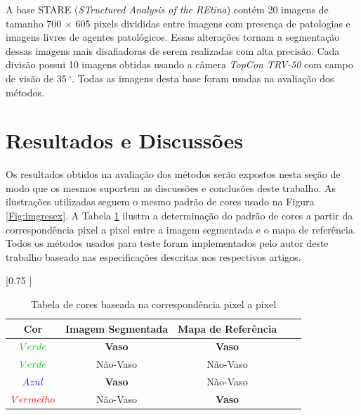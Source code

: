 A base STARE (\textit{STructured Analysis of the REtina}) cont\'{e}m 20 imagens de tamanho 700 $\times$ 605 pixels divididas entre imagens com presen\c{c}a de patologias e imagens livres de agentes patol\'{o}gicos. Essas altera\c{c}\~{o}es tornam a segmenta\c{c}\~{a}o dessas imagens mais disafiadoras de serem realizadas com alta precis\~{a}o. Cada divis\~{a}o possui 10 imagens obtidas usando a c\^{a}mera \textit{TopCon TRV-50} com campo de vis\~{a}o de $35\,^{\circ}$. Todas as imagens desta base foram usadas na avalia\c{c}\~{a}o dos m\'{e}todos.

\section{Resultados e Discuss\~{o}es}

Os resultados obtidos na avalia\c{c}\~{a}o dos m\'{e}todos ser\~{a}o expostos nesta se\c{c}\~{a}o de modo que os mesmos suportem as discuss\~{o}es e conclus\~{o}es deste trabalho. As ilustra\c{c}\~{o}es utilizadas seguem o mesmo padr\~{a}o de cores usado na Figura \ref{Fig:imgresex}. A Tabela \ref{tabcor} ilustra a determina\c{c}\~{a}o do padr\~{a}o de cores a partir da correspond\^{e}ncia pixel a pixel entre a imagem segmentada e o mapa de refer\^{e}ncia. Todos os m\'{e}todos usados para teste foram implementados pelo autor deste trabalho baseado nas especifica\c{c}\~{o}es descritas nos respectivos artigos. 

  \begin{table}[h]
   \caption{Tabela de cores baseada na correspond\^{e}ncia pixel a pixel}
    \label{tabcor}
    \centering
    [0.75 ]{ 
      \begin{tabular}{c|cccc}
        \toprule
        Cor & Imagem Segmentada & Mapa de Refer\^{e}ncia \\
        \midrule                 
        $\color{LG} Verde$  &\textbf{Vaso} &\textbf{Vaso} \\
        $\color{LG} Verde$  &N\~{a}o-Vaso &N\~{a}o-Vaso \\
        $\color{LB} Azul$  &\textbf{Vaso} &N\~{a}o-Vaso \\
        $\color{LR} Vermelho$  &N\~{a}o-Vaso &\textbf{Vaso} \\
        \bottomrule
      \end{tabular}
    }
  \end{table}

